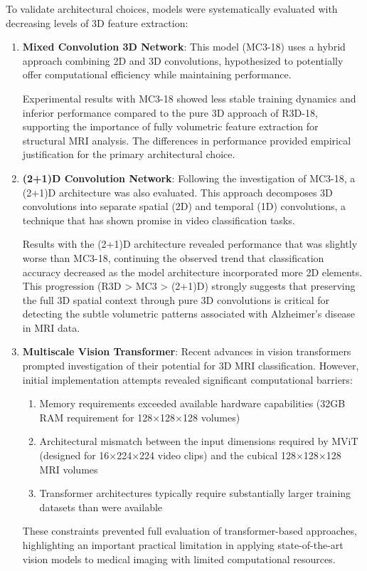 \documentclass[12pt, a4paper]{article}
\begin{document}
To validate architectural choices, models were systematically evaluated with decreasing levels of 3D feature extraction:

\begin{enumerate}
    \item \textbf{Mixed Convolution 3D Network}: This model (MC3-18) uses a hybrid approach combining 2D and 3D convolutions, hypothesized to potentially offer computational efficiency while maintaining performance.
      
      Experimental results with MC3-18 showed less stable training dynamics and inferior performance compared to the pure 3D approach of R3D-18, supporting the importance of fully volumetric feature extraction for structural MRI analysis. The differences in performance provided empirical justification for the primary architectural choice.

    \item \textbf{(2+1)D Convolution Network}: Following the investigation of MC3-18, a (2+1)D architecture was also evaluated. This approach decomposes 3D convolutions into separate spatial (2D) and temporal (1D) convolutions, a technique that has shown promise in video classification tasks.
      
      Results with the (2+1)D architecture revealed performance that was slightly worse than MC3-18, continuing the observed trend that classification accuracy decreased as the model architecture incorporated more 2D elements. This progression (R3D > MC3 > (2+1)D) strongly suggests that preserving the full 3D spatial context through pure 3D convolutions is critical for detecting the subtle volumetric patterns associated with Alzheimer's disease in MRI data.
      
    \item \textbf{Multiscale Vision Transformer}: Recent advances in vision transformers prompted investigation of their potential for 3D MRI classification. However, initial implementation attempts revealed significant computational barriers:
      
      \begin{enumerate}
        \item Memory requirements exceeded available hardware capabilities (32GB RAM requirement for 128×128×128 volumes)
        \item Architectural mismatch between the input dimensions required by MViT (designed for 16×224×224 video clips) and the cubical 128×128×128 MRI volumes
        \item Transformer architectures typically require substantially larger training datasets than were available
      \end{enumerate}
      
      These constraints prevented full evaluation of transformer-based approaches, highlighting an important practical limitation in applying state-of-the-art vision models to medical imaging with limited computational resources.
\end{enumerate}
\end{document}
